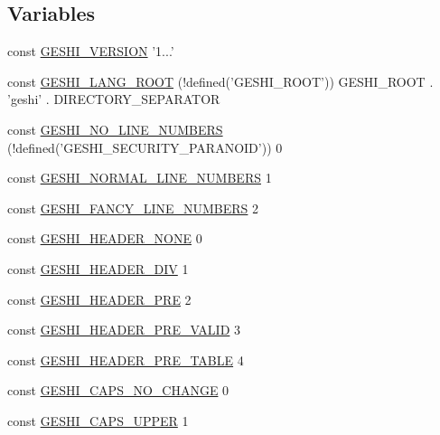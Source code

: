 \subsection*{Variables}
\begin{DoxyCompactItemize}
\item 
const \hyperlink{geshi_8php_ad1ea05c1a2b4ad5c5f0f45d4e4a63366}{G\-E\-S\-H\-I\-\_\-\-V\-E\-R\-S\-I\-O\-N} '1...'
\item 
const \hyperlink{geshi_8php_a9771b008486bce86bfb0f9e943d2e5dc}{G\-E\-S\-H\-I\-\_\-\-L\-A\-N\-G\-\_\-\-R\-O\-O\-T} (!defined('G\-E\-S\-H\-I\-\_\-\-R\-O\-O\-T')) G\-E\-S\-H\-I\-\_\-\-R\-O\-O\-T . 'geshi' . D\-I\-R\-E\-C\-T\-O\-R\-Y\-\_\-\-S\-E\-P\-A\-R\-A\-T\-O\-R
\item 
const \hyperlink{geshi_8php_a1fe21885ebfc0b528b68b49fe6ab3733}{G\-E\-S\-H\-I\-\_\-\-N\-O\-\_\-\-L\-I\-N\-E\-\_\-\-N\-U\-M\-B\-E\-R\-S} (!defined('G\-E\-S\-H\-I\-\_\-\-S\-E\-C\-U\-R\-I\-T\-Y\-\_\-\-P\-A\-R\-A\-N\-O\-I\-D')) 0
\item 
const \hyperlink{geshi_8php_ab1dda8d09574432f161e371a5b546eed}{G\-E\-S\-H\-I\-\_\-\-N\-O\-R\-M\-A\-L\-\_\-\-L\-I\-N\-E\-\_\-\-N\-U\-M\-B\-E\-R\-S} 1
\item 
const \hyperlink{geshi_8php_ad705070ddd8a239290d108e9216b83c5}{G\-E\-S\-H\-I\-\_\-\-F\-A\-N\-C\-Y\-\_\-\-L\-I\-N\-E\-\_\-\-N\-U\-M\-B\-E\-R\-S} 2
\item 
const \hyperlink{geshi_8php_a7a7da92dd3c2b88d57c9e500da2d7d48}{G\-E\-S\-H\-I\-\_\-\-H\-E\-A\-D\-E\-R\-\_\-\-N\-O\-N\-E} 0
\item 
const \hyperlink{geshi_8php_aaf89a0cee502125f533c73fc882c187d}{G\-E\-S\-H\-I\-\_\-\-H\-E\-A\-D\-E\-R\-\_\-\-D\-I\-V} 1
\item 
const \hyperlink{geshi_8php_ae6e4b0569a0794d3a19b018f7d0a9b4c}{G\-E\-S\-H\-I\-\_\-\-H\-E\-A\-D\-E\-R\-\_\-\-P\-R\-E} 2
\item 
const \hyperlink{geshi_8php_a420a1caf47363654a1490d32b632df2b}{G\-E\-S\-H\-I\-\_\-\-H\-E\-A\-D\-E\-R\-\_\-\-P\-R\-E\-\_\-\-V\-A\-L\-I\-D} 3
\item 
const \hyperlink{geshi_8php_a17d7284d6735bd6e83c08da290120429}{G\-E\-S\-H\-I\-\_\-\-H\-E\-A\-D\-E\-R\-\_\-\-P\-R\-E\-\_\-\-T\-A\-B\-L\-E} 4
\item 
const \hyperlink{geshi_8php_a40b50be2e6b442c4fc83b917690ee4fc}{G\-E\-S\-H\-I\-\_\-\-C\-A\-P\-S\-\_\-\-N\-O\-\_\-\-C\-H\-A\-N\-G\-E} 0
\item 
const \hyperlink{geshi_8php_afa69823ba88fb942e2deb2b7a737df11}{G\-E\-S\-H\-I\-\_\-\-C\-A\-P\-S\-\_\-\-U\-P\-P\-E\-R} 1

\end{DoxyCompactItemize}
